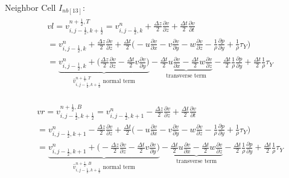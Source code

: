 \documentclass{article}
\numberwithin{equation}{subsection}
\begin{document}
Neighbor Cell $I_{nb[13]}$:
\begin{align}
\begin{split}
& vl = v_{i,j-\frac{1}{2},k+\frac{1}{2}}^{n+\frac{1}{2},T} = v_{i,j-\frac{1}{2},k}^n + \frac{\Delta z}{2}\frac{\partial v}{\partial z} + \frac{\Delta t}{2}\frac{\partial v}{\partial t} \\
&= v_{i,j-\frac{1}{2},k}^n + \frac{\Delta z}{2} \frac{\partial v}{\partial z} + \frac{\Delta t}{2} \Big( -u\frac{\partial v}{\partial x} -v\frac{\partial v}{\partial y} -w\frac{\partial v}{\partial z} - \frac{1}{\rho}\frac{\partial p}{\partial y} +\frac{1}{\rho}\tau_Y\Big) \\
&= \underbrace{v_{i,j-\frac{1}{2},k}^n + \Big(\frac{\Delta z}{2}\frac{\partial v}{\partial z} - \frac{\Delta t}{2} v\frac{\partial v}{\partial y}\Big)}_\text{$\widehat{v}_{i,j-\frac{1}{2},k+\frac{1}{2}}^{n+\frac{1}{2},T}$ normal term} -\underbrace{\frac{\Delta t}{2}u\frac{\partial v}{\partial x} - \frac{\Delta t}{2}w\frac{\partial v}{\partial z}}_\text{transverse term} - \frac{\Delta t}{2}\frac{1}{\rho}\frac{\partial p}{\partial y} + \frac{\Delta t}{2}\frac{1}{\rho}\tau_Y
\end{split}
\end{align}

\begin{align}
\begin{split}
& vr = v_{i,j-\frac{1}{2},k+\frac{1}{2}}^{n+\frac{1}{2},B} = v_{i,j-\frac{1}{2},k+1}^n - \frac{\Delta z}{2}\frac{\partial v}{\partial z} + \frac{\Delta t}{2}\frac{\partial v}{\partial t} \\
&= v_{i,j-\frac{1}{2},k+1}^n - \frac{\Delta z}{2} \frac{\partial v}{\partial z} + \frac{\Delta t}{2} \Big( -u\frac{\partial v}{\partial x} -v\frac{\partial v}{\partial y} -w\frac{\partial v}{\partial z} - \frac{1}{\rho}\frac{\partial p}{\partial y} +\frac{1}{\rho}\tau_Y\Big) \\
&= \underbrace{v_{i,j-\frac{1}{2},k+1}^n + \Big(-\frac{\Delta z}{2}\frac{\partial v}{\partial z} - \frac{\Delta t}{2} v\frac{\partial v}{\partial y}\Big)}_\text{$\widehat{v}_{i,j-\frac{1}{2},k+\frac{1}{2}}^{n+\frac{1}{2},B}$ normal term} -\underbrace{\frac{\Delta t}{2}u\frac{\partial v}{\partial x} - \frac{\Delta t}{2}w\frac{\partial v}{\partial z}}_\text{transverse term} - \frac{\Delta t}{2}\frac{1}{\rho}\frac{\partial p}{\partial y} + \frac{\Delta t}{2}\frac{1}{\rho}\tau_Y
\end{split}
\end{align}
\end{document}
